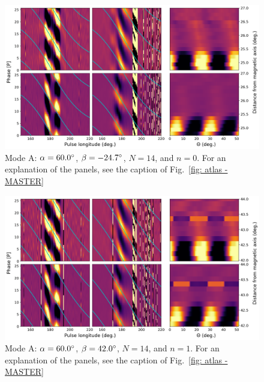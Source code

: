 \begin{figure}
	\begin{center}
		\includegraphics[width=\atlasHeightFrac\textwidth]{Figures/B0031/atlas/A_517060014000_plots}
		\caption[Atlas results: Mode A -- $\alpha=60.0\degr$, $\beta=-24.7\degr$, $N=14$, $n=0$]{Mode A: $\alpha=60.0\degr$, $\beta=-24.7\degr$, $N=14$, and $n=0$. For an explanation of the panels, see the caption of Fig.~\ref{fig: atlas - MASTER} }
		\label{fig: atlas - A_517060014000}
	\end{center}
\end{figure}

\begin{figure}
	\begin{center}
		\includegraphics[width=\atlasHeightFrac\textwidth]{Figures/B0031/atlas/A_517060014001_plots}
		\caption[Atlas results: Mode A -- $\alpha=60.0\degr$, $\beta=42.0\degr$, $N=14$, $n=1$]{Mode A: $\alpha=60.0\degr$, $\beta=42.0\degr$, $N=14$, and $n=1$. For an explanation of the panels, see the caption of Fig.~\ref{fig: atlas - MASTER} }
		\label{fig: atlas - A_517060014001}
	\end{center}
\end{figure}

